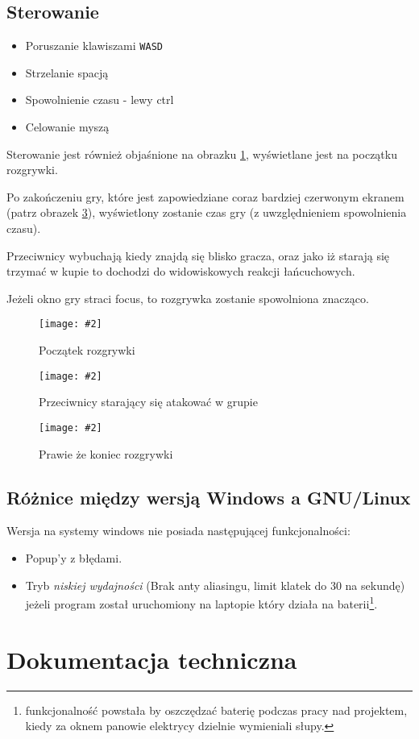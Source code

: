 \documentclass[a4paper,11pt]{article}
\newcommand{\obrazek}[3]{
\begin{figure}[p]
    \centering
    \texttt{[image: \#2]}
    \caption{#3}\label{obr:#2}
\end{figure}
}
\begin{document}
\subsection*{Sterowanie}

\begin{itemize}
    \item Poruszanie klawiszami \texttt{WASD}
    \item Strzelanie spacją
    \item Spowolnienie czasu - lewy ctrl
    \item Celowanie myszą
\end{itemize}

Sterowanie jest również objaśnione na obrazku \ref{obr:controls.png}, wyświetlane jest na początku rozgrywki.

Po zakończeniu gry, które jest zapowiedziane coraz bardziej czerwonym ekranem (patrz obrazek \ref{obr:lowHP.png}), wyświetlony zostanie czas gry (z uwzględnieniem spowolnienia czasu).

Przeciwnicy wybuchają kiedy znajdą się blisko gracza, oraz jako iż starają się trzymać w kupie to dochodzi do widowiskowych reakcji łańcuchowych.

Jeżeli okno gry straci focus, to rozgrywka zostanie spowolniona znacząco.

\obrazek{.2}{controls.png}{Początek rozgrywki}

\obrazek{.2}{enemies.png}{Przeciwnicy starający się atakować w grupie}

\obrazek{.2}{lowHP.png}{Prawie że koniec rozgrywki}

\subsection*{Różnice między wersją Windows a GNU/Linux}

Wersja na systemy windows nie posiada następującej funkcjonalności:
\begin{itemize}
    \item Popup'y z błędami.
    \item Tryb \emph{niskiej wydajności} (Brak anty aliasingu, limit klatek do
        30 na sekundę) jeżeli program został uruchomiony na laptopie który
        działa na baterii\footnote{funkcjonalność powstała by oszczędzać baterię
        podczas pracy nad projektem, kiedy za oknem panowie elektrycy dzielnie
        wymieniali słupy.}.
\end{itemize}

\section{Dokumentacja techniczna}
\end{document}
